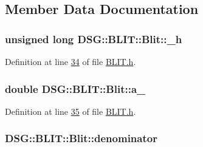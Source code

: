 \subsection{Member Data Documentation}
\hypertarget{class_d_s_g_1_1_b_l_i_t_1_1_blit_a632c6f070187969b90c70b65668b82bc}{
\subsubsection[{\+\_\+h}]{\setlength{\rightskip}{0pt plus 5cm}unsigned long D\+S\+G\+::\+B\+L\+I\+T\+::\+Blit\+::\+\_\+h\hspace{0.3cm}{\ttfamily [protected]}}}\label{class_d_s_g_1_1_b_l_i_t_1_1_blit_a632c6f070187969b90c70b65668b82bc}


Definition at line \hyperlink{_b_l_i_t_8h_source_l00034}{34} of file \hyperlink{_b_l_i_t_8h_source}{B\+L\+I\+T.\+h}.

\hypertarget{class_d_s_g_1_1_b_l_i_t_1_1_blit_a66e2a97840ad0772daaaa9aea63b77b4}{
\subsubsection[{a\+\_\+}]{\setlength{\rightskip}{0pt plus 5cm}double D\+S\+G\+::\+B\+L\+I\+T\+::\+Blit\+::a\+\_\+\hspace{0.3cm}{\ttfamily [protected]}}}\label{class_d_s_g_1_1_b_l_i_t_1_1_blit_a66e2a97840ad0772daaaa9aea63b77b4}


Definition at line \hyperlink{_b_l_i_t_8h_source_l00035}{35} of file \hyperlink{_b_l_i_t_8h_source}{B\+L\+I\+T.\+h}.

\hypertarget{class_d_s_g_1_1_b_l_i_t_1_1_blit_a6de89a5a240f226c940aef97661c9cee}{
\subsubsection[{denominator}]{ D\+S\+G\+::\+B\+L\+I\+T\+::\+Blit\+::denominator\hspace{0.3cm}{\ttfamily [protected]}}}\label{class_d_s_g_1_1_b_l_i_t_1_1_blit_a6de89a5a240f226c940aef97661c9cee}


